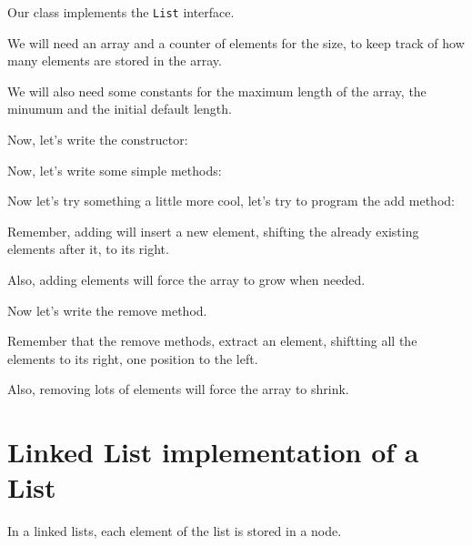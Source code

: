 \documentclass[a4paper, 9pt]{extarticle}
\begin{document}
Our class implements the \verb+List+ interface.

We will need an array and a counter of elements for the size, to keep track of
how many elements are stored in the array.

We will also need some constants for the maximum length of the array, the
minumum and the initial default length.

Now, let's write the constructor:


Now, let's write some simple methods:




Now let's try something a little more cool, let's try to program the add method:

Remember, adding will insert a new element, shifting the already existing elements after it, to its right.

Also, adding elements will force the array to grow when needed.




Now let's write the remove method.

Remember that the remove methods, extract an element, shiftting all the elements to its right, one position to the left.

Also, removing lots of elements will force the array to shrink.









\section{Linked List implementation of a List}

In a linked lists, each element of the list is stored in a node.
\end{document}
